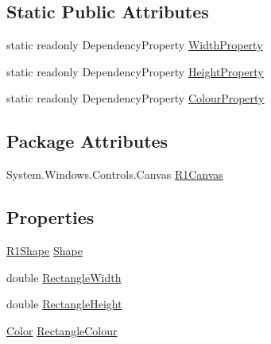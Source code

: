 \subsection*{Static Public Attributes}
\begin{DoxyCompactItemize}
\item 
static readonly Dependency\+Property \hyperlink{class_c_p_u___o_s___simulator_1_1_controls_1_1_resource___controls_1_1_r1_control_a25a96fc1df1f8352a19a6834fe4c88f3}{Width\+Property}
\item 
static readonly Dependency\+Property \hyperlink{class_c_p_u___o_s___simulator_1_1_controls_1_1_resource___controls_1_1_r1_control_afe99fcf8276ab5c238fa7456413ff4be}{Height\+Property}
\item 
static readonly Dependency\+Property \hyperlink{class_c_p_u___o_s___simulator_1_1_controls_1_1_resource___controls_1_1_r1_control_aa778bafc6af7a12101c6809551838fd1}{Colour\+Property}
\end{DoxyCompactItemize}
\subsection*{Package Attributes}
\begin{DoxyCompactItemize}
\item 
System.\+Windows.\+Controls.\+Canvas \hyperlink{class_c_p_u___o_s___simulator_1_1_controls_1_1_resource___controls_1_1_r1_control_a26aaa37996377c1b194a23dad183c1b8}{R1\+Canvas}
\end{DoxyCompactItemize}
\subsection*{Properties}
\begin{DoxyCompactItemize}
\item 
\hyperlink{class_c_p_u___o_s___simulator_1_1_controls_1_1_resource___controls_1_1_shapes_1_1_r1_shape}{R1\+Shape} \hyperlink{class_c_p_u___o_s___simulator_1_1_controls_1_1_resource___controls_1_1_r1_control_a700f297e01c70f960fde694275f61250}{Shape}
\item 
double \hyperlink{class_c_p_u___o_s___simulator_1_1_controls_1_1_resource___controls_1_1_r1_control_a48842db3fde07b0bc2080d1778f5d744}{Rectangle\+Width}
\item 
double \hyperlink{class_c_p_u___o_s___simulator_1_1_controls_1_1_resource___controls_1_1_r1_control_afb95e0c7a7af38306b3d1114cec98cdc}{Rectangle\+Height}
\item 
\hyperlink{_console_window_8xaml_8cs_adf2800823d988ace598d734fdec29975}{Color} \hyperlink{class_c_p_u___o_s___simulator_1_1_controls_1_1_resource___controls_1_1_r1_control_ad6212343f11c4dfb5677948fb76ea179}{Rectangle\+Colour}
\end{DoxyCompactItemize}
